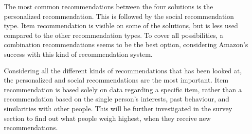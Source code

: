 The most common recommendations between the four solutions is the personalized recommendation. This is followed by the social recommendation type. Item recommendation is visible on some of the solutions, but is less used compared to the other recommendation types. To cover all possibilities, a combination recommendations seems to be the best option, considering Amazon’s success with this kind of recommendation system.

Considering all the different kinds of recommendations that has been looked at, the personalized and social recommendations are the most important. Item recommendation is based solely on data regarding a specific item, rather than a recommendation based on the single person's interests, past behaviour, and similarities with other people. This will be further investigated in the survey section to find out what people weigh highest, when they receive new recommendations.